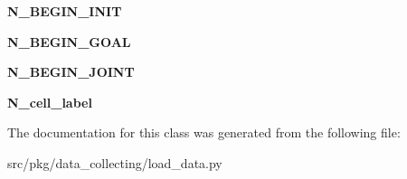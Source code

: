 \begin{DoxyCompactItemize}
{\bfseries N\+\_\+\+B\+E\+G\+I\+N\+\_\+\+I\+N\+IT}
\item 
\mbox{\label{classrnb-planning_1_1src_1_1pkg_1_1data__collecting_1_1load__data_1_1_data_loader_a9f0a1ce05180f56d9b6e354f3c506687}} 
{\bfseries N\+\_\+\+B\+E\+G\+I\+N\+\_\+\+G\+O\+AL}
\item 
\mbox{\label{classrnb-planning_1_1src_1_1pkg_1_1data__collecting_1_1load__data_1_1_data_loader_a851965128f7bf22810efb7699df0b3c8}} 
{\bfseries N\+\_\+\+B\+E\+G\+I\+N\+\_\+\+J\+O\+I\+NT}
\item 
\mbox{\label{classrnb-planning_1_1src_1_1pkg_1_1data__collecting_1_1load__data_1_1_data_loader_ae997d3e91ddda58af32a13df4908e72a}} 
{\bfseries N\+\_\+cell\+\_\+label}
\end{DoxyCompactItemize}


The documentation for this class was generated from the following file\+:\begin{DoxyCompactItemize}
\item 
src/pkg/data\+\_\+collecting/load\+\_\+data.\+py\end{DoxyCompactItemize}
